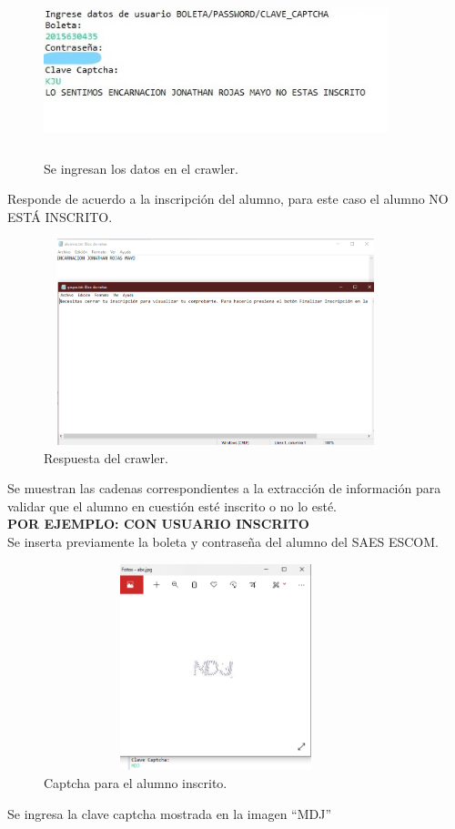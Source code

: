 	\begin{figure}[hbt!]
		\centering
		\includegraphics[width=10cm, height=5cm]{Imagenes/Crawler/Datosloginnoinscrito}
		\caption{Se ingresan los datos en el crawler.}
		\label{datosloginnoinscrito}
	\end{figure}
	\noindent Responde de acuerdo a la inscripción del alumno, para este caso el alumno NO ESTÁ INSCRITO.
	\pagebreak
	
	\begin{figure}[hbt!]
		\centering
		\includegraphics[width=10cm, height=6cm]{Imagenes/Crawler/Noinscrito}
		\caption{Respuesta del crawler.}
		\label{noinscrito}
	\end{figure}
	
	\noindent Se muestran las cadenas correspondientes a la extracción de información para validar que el alumno en cuestión esté inscrito o no lo esté.\\
	
	\textbf{POR EJEMPLO: CON USUARIO INSCRITO}\\
	\noindent Se inserta previamente la boleta y contraseña del alumno del SAES ESCOM.
	
	\begin{figure}[hbt!]
		\centering
		\includegraphics[width=10cm, height=6cm]{Imagenes/Crawler/Imagenlogininscrito}
		\caption{Captcha para el alumno inscrito.}
		\label{imagenlogininscrito}
	\end{figure}
	\noindent Se ingresa la clave captcha mostrada en la imagen “MDJ”
	\pagebreak
	

